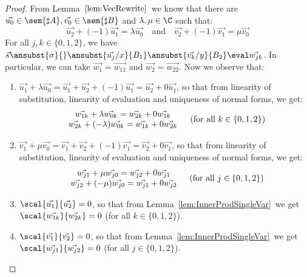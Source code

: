 \begin{proof}
    From Lemma~$\ref{lem:VecRewrite}$~we know that there are $\vec{u_0}\in\sem{\sharp A}, \vec{v_0}\in\sem{\sharp B}$ and $\lambda,\mu\in\C$ such that:
    \[
    \vec{u_2} + (-1) \vec{u_1} = \lambda\vec{u_0}\quad\text{and}\quad\vec{v_2} + (-1) \vec{v_1} = \mu \vec{v_0}
    \]
    For all $j,k\in\{0,1,2\}$, we have $\vec{s}\ansubst{\sigma}{}\ansubst{\vec{u_j}/x}{B_1}\ansubst{\vec{v_k}/y}{B_2}\eval\vec{w_{jk}}$. In particular, we can take $\vec{w_1}=\vec{w_{11}}$ and $\vec{w_2}=\vec{w_{22}}$. Now we observe that:
    \begin{enumerate}
        \item\label{A8:it1} $\vec{u_1}+\lambda\vec{u_0}= \vec{u_1} + \vec{u_2} + (-1) \vec{u_1}= \vec{u_2} + 0\vec{u_1}$, so that from linearity of substitution, linearity of evaluation and uniqueness of normal forms, we get:
        \[
        \begin{array}{c c}
            \begin{array}{c}
                \vec{w_{1k}} + \lambda\vec{w_{0k}} = \vec{w_{2k}} + 0 \vec{w_{1k}}\\
                \vec{w_{2k}} + (-\lambda)\vec{w_{0k}} = \vec{w_{1k}} + 0 \vec{w_{2k}}
            \end{array}&
            (\text{for all }k\in\{0,1,2\})
        \end{array}
        \]
        
        \item\label{A8:it2} $\vec{v_1}+\mu\vec{v_0}= \vec{v_1} + \vec{v_2} + (-1) \vec{v_1}= \vec{v_2} + 0\vec{v_1}$, so that from linearity of substitution, linearity of evaluation and uniqueness of normal forms, we get:
        \[
        \begin{array}{c c}
            \begin{array}{c}
                \vec{w_{j1}} + \mu\vec{w_{j0}} = \vec{w_{j2}} + 0 \vec{w_{j1}}\\
                \vec{w_{j2}} + (-\mu)\vec{w_{j0}} = \vec{w_{j1}} + 0 \vec{w_{j2}}
            \end{array}&
            (\text{for all }j\in\{0,1,2\})
        \end{array}
        \]
        
        \item\label{A8:it3} $\scal{\vec{u_1}}{\vec{u_2}}=0$, so that from Lemma~\ref{lem:InnerProdSingleVar}~we get $\scal{\vec{w_{1k}}}{\vec{w_{2k}}}=0$ (for all $k\in\{0,1,2\}$).
        
        \item\label{A8:it4} $\scal{\vec{v_1}}{\vec{v_2}}=0$, so that from Lemma~\ref{lem:InnerProdSingleVar}~we get $\scal{\vec{w_{j1}}}{\vec{w_{j2}}}=0$ (for all $j\in\{0,1,2\}$).
    \end{enumerate}


\end{proof}
